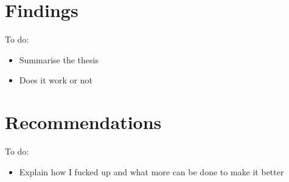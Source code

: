 
\section{Findings}

\color{red}
To do:
\begin{itemize}
	\item Summarise the thesis
	\item Does it work or not
\end{itemize}
\color{black}

\section{Recommendations}

\color{red}
To do:
\begin{itemize}
	\item Explain how I fucked up and what more can be done to make it better
\end{itemize}
\color{black}
